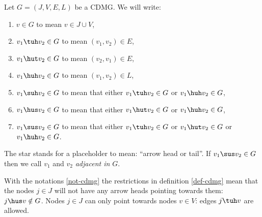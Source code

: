 \begin{Not}
    \label{not-cdmg}
    Let $G=(J,V,E,L)$ be a CDMG.
    We will write:
    \begin{enumerate}
        \item $v \in G$ to mean $v \in J \cup V$,
        \item $v_1 \tuh v_2 \in G$ to mean $(v_1,v_2) \in E$,
        \item $v_1 \hut v_2 \in G$ to mean $(v_2,v_1) \in E$,
        \item $v_1 \huh v_2 \in G$ to mean $(v_1,v_2) \in L$,
        \item $v_1 \suh v_2 \in G$ to mean that either $v_1 \tuh v_2 \in G$ or $v_1 \huh v_2 \in G$,
        \item $v_1 \hus v_2 \in G$ to mean that either $v_1 \hut v_2 \in G$ or $v_1 \huh v_2 \in G$,
        \item $v_1 \sus v_2 \in G$ to mean that either $v_1 \tuh v_2 \in G$ or $v_1 \hut v_2 \in G$ or $v_1 \huh v_2 \in G$.
    \end{enumerate}
    The star stands for a placeholder to mean: ``arrow head or tail''.
    If $v_1 \sus v_2 \in G$ then we call $v_1$ and $v_2$ \emph{adjacent in $G$}.
\end{Not}

\begin{Rem}
With the notations \ref{not-cdmg} the restrictions in definition \ref{def-cdmg} mean that the nodes $j \in J$ will not have any arrow heads pointing towards them: $ j \hus v \notin G$. Nodes $j \in J$ can only point towards nodes $v \in V$: edges $j \tuh v$ are allowed.
\end{Rem}

